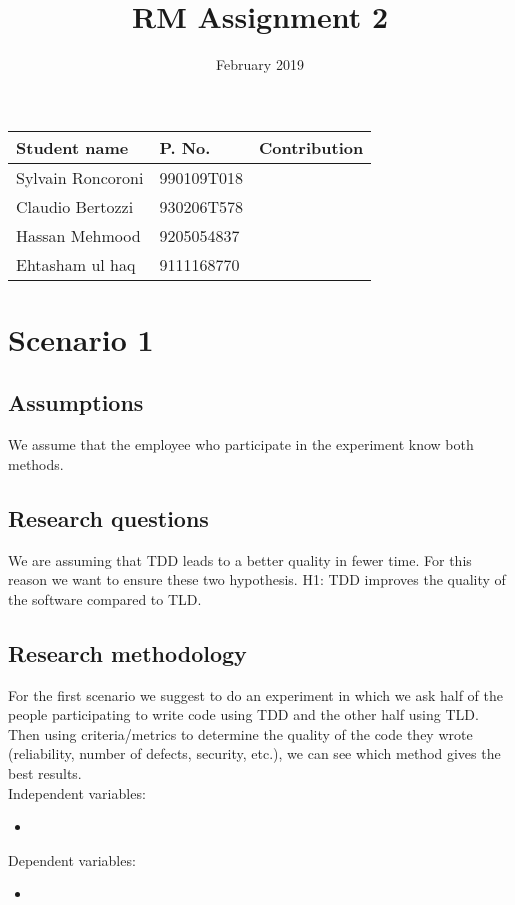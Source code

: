 \documentclass{article}
\title{RM Assignment 2}
\date{February 2019}
\begin{document}
\maketitle

\begin{tabular}{|l|l|l|}
\hline
     \textbf{Student name} & \textbf{P. No.} & \textbf{Contribution} \\
     \hline
     Sylvain Roncoroni & 990109T018 & \\
     Claudio Bertozzi & 930206T578 & \\
     Hassan Mehmood & 9205054837 & \\
     Ehtasham ul haq & 9111168770\\
     \hline
\end{tabular}


\section{Scenario 1}
\subsection{Assumptions}
We assume that the employee who participate in the experiment know both methods.

\subsection{Research questions}
We are assuming that TDD leads to a better quality in fewer time. For this reason we want to ensure these two hypothesis.
H1: TDD improves the quality of the software compared to TLD.

\subsection{Research methodology}
For the first scenario we suggest to do an experiment in which we ask half of the people participating to write code using TDD and the other half using TLD. Then using criteria/metrics to determine the quality of the code they wrote (reliability, number of defects, security, etc.), we can see which method gives the best results.\\
Independent variables:
\begin{itemize}
    \item
\end{itemize}
Dependent variables:
\begin{itemize}
    \item
\end{itemize}
\end{document}
